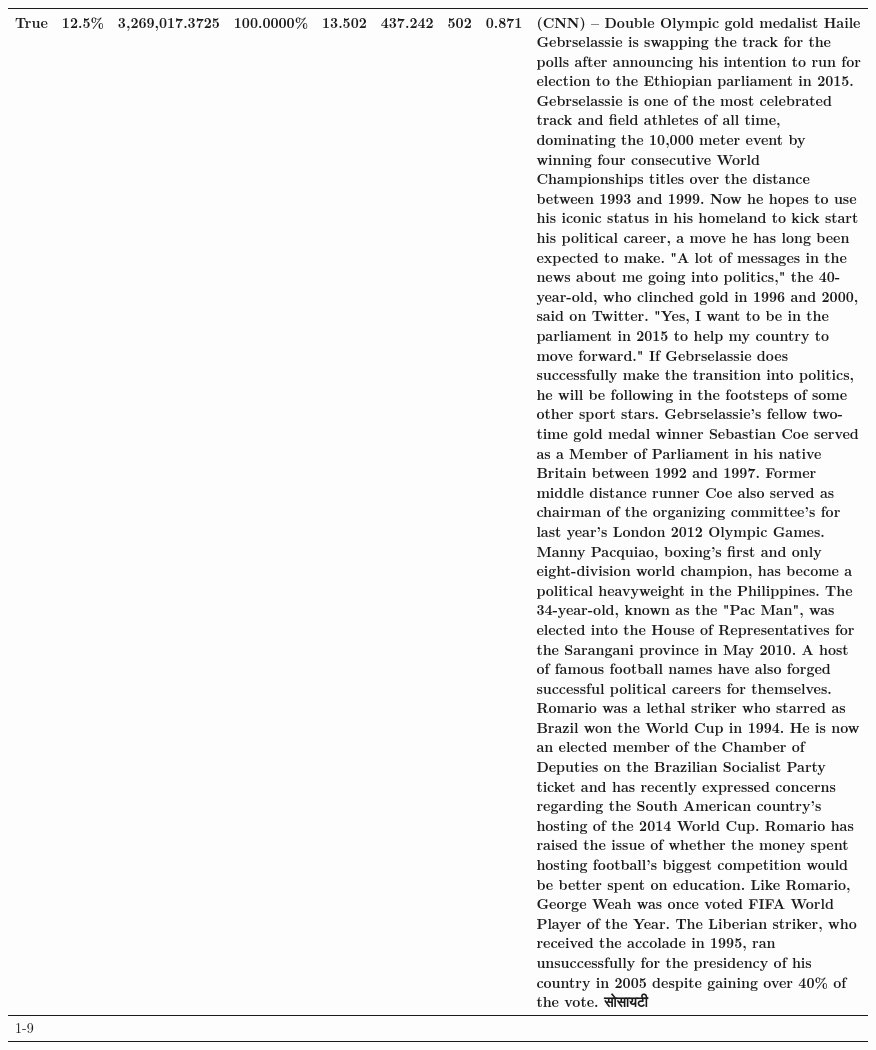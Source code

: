 \begin{table}[H]
{\begin{tabular}{lllrlllll}
True & 12.5\% & 3,269,017.3725 & \bfseries \color{red} 100.0000\% & 13.502 & 437.242 & 502 & 0.871 & (CNN) -- Double Olympic gold medalist Haile Gebrselassie is swapping the track for the polls after announcing his intention to run for election to the Ethiopian parliament in 2015. Gebrselassie is one of the most celebrated track and field athletes of all time, dominating the 10,000 meter event by winning four consecutive World Championships titles over the distance between 1993 and 1999. Now he hopes to use his iconic status in his homeland to kick start his political career, a move he has long been expected to make. "A lot of messages in the news about me going into politics," the 40-year-old, who clinched gold in 1996 and 2000, said on Twitter. "Yes, I want to be in the parliament in 2015 to help my country to move forward." If Gebrselassie does successfully make the transition into politics, he will be following in the footsteps of some other sport stars. Gebrselassie's fellow two-time gold medal winner Sebastian Coe served as a Member of Parliament in his native Britain between 1992 and 1997. Former middle distance runner Coe also served as chairman of the organizing committee's for last year's London 2012 Olympic Games. Manny Pacquiao, boxing's first and only eight-division world champion, has become a political heavyweight in the Philippines. The 34-year-old, known as the "Pac Man", was elected into the House of Representatives for the Sarangani province in May 2010. A host of famous football names have also forged successful political careers for themselves. Romario was a lethal striker who starred as Brazil won the World Cup in 1994. He is now an elected member of the Chamber of Deputies on the Brazilian Socialist Party ticket and has recently expressed concerns regarding the South American country's hosting of the 2014 World Cup. Romario has raised the issue of whether the money spent hosting football's biggest competition would be better spent on education. Like Romario, George Weah was once voted FIFA World Player of the Year. The Liberian striker, who received the accolade in 1995, ran unsuccessfully for the presidency of his country in 2005 despite gaining over 40\% of the vote. सोसायटी \\
\cline{1-9}

\end{tabular}}
\end{table}
